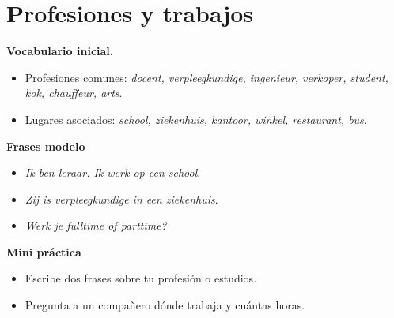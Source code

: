\section{Profesiones y trabajos}
\textbf{Vocabulario inicial.}
\begin{itemize}[leftmargin=*]
  \item Profesiones comunes: \textit{docent, verpleegkundige, ingenieur, verkoper, student, kok, chauffeur, arts}.
  \item Lugares asociados: \textit{school, ziekenhuis, kantoor, winkel, restaurant, bus}.
\end{itemize}

\textbf{Frases modelo}
\begin{itemize}[leftmargin=*]
  \item \textit{Ik ben leraar. Ik werk op een school}.
  \item \textit{Zij is verpleegkundige in een ziekenhuis}.
  \item \textit{Werk je fulltime of parttime?}
\end{itemize}

\textbf{Mini práctica}
\begin{itemize}[leftmargin=*]
  \item Escribe dos frases sobre tu profesión o estudios.
  \item Pregunta a un compañero dónde trabaja y cuántas horas.
\end{itemize}
